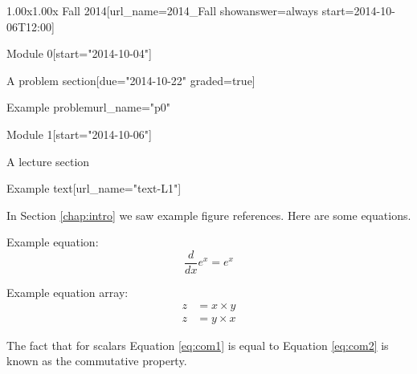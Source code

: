 \documentclass[12pt]{article}
\begin{document}
\begin{edXcourse}{1.00x}{1.00x Fall 2014}[url_name=2014_Fall showanswer=always start=2014-10-06T12:00]
\begin{edXchapter*}{Module 0}[start="2014-10-04"]
\begin{edXsequential}{A problem section}[due="2014-10-22" graded=true]
\begin{edXproblem}{Example problem}{url_name="p0"}
\end{edXproblem}

\end{edXsequential}

\end{edXchapter*}

\begin{edXchapter}{Module 1}[start="2014-10-06"]

\begin{edXsequential}{A lecture section}

\begin{edXtext}{Example text}[url_name="text-L1"]

In Section \ref{chap:intro} we saw example figure references.  Here are some equations.

Example equation:
\begin{equation}
  \frac{d}{dx} e^x = e^x
  \label{eq:deriv}
\end{equation}

Example equation array:
\begin{eqnarray}
  z & = x \times y \label{eq:com1}\\
  z & = y \times x \label{eq:com2}
\end{eqnarray}

The fact that for scalars Equation \ref{eq:com1} is equal to Equation \ref{eq:com2} is known as the commutative property.

\end{edXtext}

\end{edXsequential}

\end{edXchapter}

\end{edXcourse}
\end{document}
